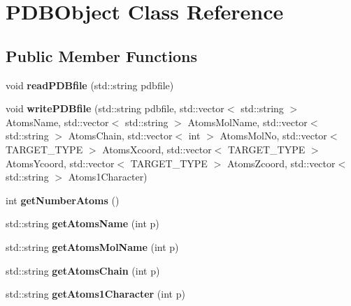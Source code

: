 \hypertarget{classPDBObject}{}\section{P\+D\+B\+Object Class Reference}
\label{classPDBObject}
\subsection*{Public Member Functions}
\begin{DoxyCompactItemize}
\item 
void {\bfseries read\+P\+D\+Bfile} (std\+::string pdbfile)\hypertarget{classPDBObject_acdac2e8167f94f020e53f7eb96ce21ca}{}\label{classPDBObject_acdac2e8167f94f020e53f7eb96ce21ca}

\item 
void {\bfseries write\+P\+D\+Bfile} (std\+::string pdbfile, std\+::vector$<$ std\+::string $>$ Atoms\+Name, std\+::vector$<$ std\+::string $>$ Atoms\+Mol\+Name, std\+::vector$<$ std\+::string $>$ Atoms\+Chain, std\+::vector$<$ int $>$ Atoms\+Mol\+No, std\+::vector$<$ T\+A\+R\+G\+E\+T\+\_\+\+T\+Y\+PE $>$ Atoms\+Xcoord, std\+::vector$<$ T\+A\+R\+G\+E\+T\+\_\+\+T\+Y\+PE $>$ Atoms\+Ycoord, std\+::vector$<$ T\+A\+R\+G\+E\+T\+\_\+\+T\+Y\+PE $>$ Atoms\+Zcoord, std\+::vector$<$ std\+::string $>$ Atoms1\+Character)\hypertarget{classPDBObject_a19e921655d782bf8614ecab54e408789}{}\label{classPDBObject_a19e921655d782bf8614ecab54e408789}

\item 
int {\bfseries get\+Number\+Atoms} ()\hypertarget{classPDBObject_a3fa44a49172e37fe4dc7f4a7f6efa04c}{}\label{classPDBObject_a3fa44a49172e37fe4dc7f4a7f6efa04c}

\item 
std\+::string {\bfseries get\+Atoms\+Name} (int p)\hypertarget{classPDBObject_a4a7ff5b9a86ae01570551c2d2cef34be}{}\label{classPDBObject_a4a7ff5b9a86ae01570551c2d2cef34be}

\item 
std\+::string {\bfseries get\+Atoms\+Mol\+Name} (int p)\hypertarget{classPDBObject_acbe90334ea558ca5b72ca3598614d0cf}{}\label{classPDBObject_acbe90334ea558ca5b72ca3598614d0cf}

\item 
std\+::string {\bfseries get\+Atoms\+Chain} (int p)\hypertarget{classPDBObject_a4ad2e68acbc220b6e721ad8ac99d236a}{}\label{classPDBObject_a4ad2e68acbc220b6e721ad8ac99d236a}

\item 
std\+::string {\bfseries get\+Atoms1\+Character} (int p)\hypertarget{classPDBObject_ab0073b4e0fa3c2b93aa6c73698b864ce}{}\label{classPDBObject_ab0073b4e0fa3c2b93aa6c73698b864ce}


\end{DoxyCompactItemize}

